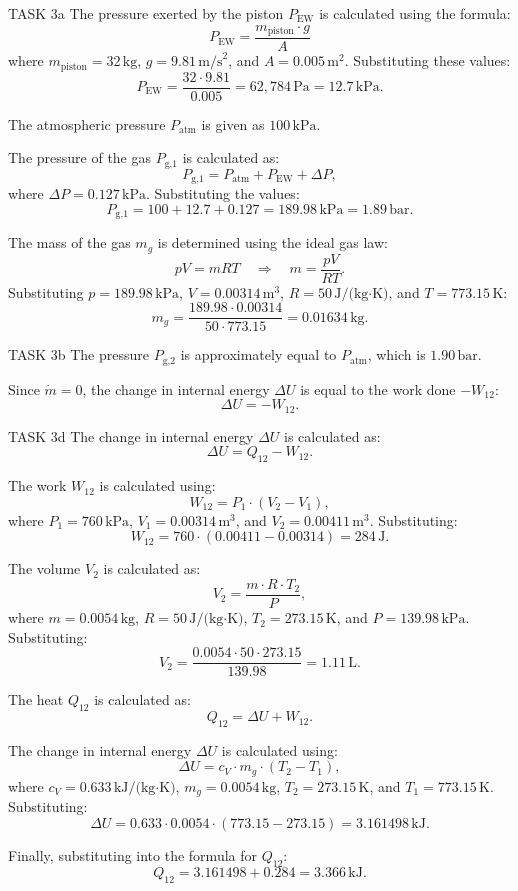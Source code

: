 TASK 3a  
The pressure exerted by the piston \( P_{\text{EW}} \) is calculated using the formula:  
\[
P_{\text{EW}} = \frac{m_{\text{piston}} \cdot g}{A}
\]  
where \( m_{\text{piston}} = 32 \, \text{kg} \), \( g = 9.81 \, \text{m/s}^2 \), and \( A = 0.005 \, \text{m}^2 \). Substituting these values:  
\[
P_{\text{EW}} = \frac{32 \cdot 9.81}{0.005} = 62,784 \, \text{Pa} = 12.7 \, \text{kPa}.
\]  

The atmospheric pressure \( P_{\text{atm}} \) is given as \( 100 \, \text{kPa} \).  

The pressure of the gas \( P_{\text{g,1}} \) is calculated as:  
\[
P_{\text{g,1}} = P_{\text{atm}} + P_{\text{EW}} + \Delta P,
\]  
where \( \Delta P = 0.127 \, \text{kPa} \). Substituting the values:  
\[
P_{\text{g,1}} = 100 + 12.7 + 0.127 = 189.98 \, \text{kPa} = 1.89 \, \text{bar}.
\]  

The mass of the gas \( m_g \) is determined using the ideal gas law:  
\[
pV = mRT \quad \Rightarrow \quad m = \frac{pV}{RT}.
\]  
Substituting \( p = 189.98 \, \text{kPa} \), \( V = 0.00314 \, \text{m}^3 \), \( R = 50 \, \text{J/(kg·K)} \), and \( T = 773.15 \, \text{K} \):  
\[
m_g = \frac{189.98 \cdot 0.00314}{50 \cdot 773.15} = 0.01634 \, \text{kg}.
\]  

TASK 3b  
The pressure \( P_{\text{g,2}} \) is approximately equal to \( P_{\text{atm}} \), which is \( 1.90 \, \text{bar} \).  

Since \( \dot{m} = 0 \), the change in internal energy \( \Delta U \) is equal to the work done \( -W_{12} \):  
\[
\Delta U = -W_{12}.
\]  

TASK 3d  
The change in internal energy \( \Delta U \) is calculated as:  
\[
\Delta U = Q_{12} - W_{12}.
\]  

The work \( W_{12} \) is calculated using:  
\[
W_{12} = P_1 \cdot (V_2 - V_1),
\]  
where \( P_1 = 760 \, \text{kPa} \), \( V_1 = 0.00314 \, \text{m}^3 \), and \( V_2 = 0.00411 \, \text{m}^3 \). Substituting:  
\[
W_{12} = 760 \cdot (0.00411 - 0.00314) = 284 \, \text{J}.
\]  

The volume \( V_2 \) is calculated as:  
\[
V_2 = \frac{m \cdot R \cdot T_2}{P},
\]  
where \( m = 0.0054 \, \text{kg} \), \( R = 50 \, \text{J/(kg·K)} \), \( T_2 = 273.15 \, \text{K} \), and \( P = 139.98 \, \text{kPa} \). Substituting:  
\[
V_2 = \frac{0.0054 \cdot 50 \cdot 273.15}{139.98} = 1.11 \, \text{L}.
\]  

The heat \( Q_{12} \) is calculated as:  
\[
Q_{12} = \Delta U + W_{12}.
\]  

The change in internal energy \( \Delta U \) is calculated using:  
\[
\Delta U = c_V \cdot m_g \cdot (T_2 - T_1),
\]  
where \( c_V = 0.633 \, \text{kJ/(kg·K)} \), \( m_g = 0.0054 \, \text{kg} \), \( T_2 = 273.15 \, \text{K} \), and \( T_1 = 773.15 \, \text{K} \). Substituting:  
\[
\Delta U = 0.633 \cdot 0.0054 \cdot (773.15 - 273.15) = 3.161498 \, \text{kJ}.
\]  

Finally, substituting into the formula for \( Q_{12} \):  
\[
Q_{12} = 3.161498 + 0.284 = 3.366 \, \text{kJ}.
\]